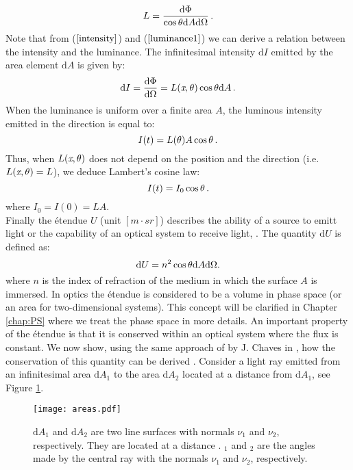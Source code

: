 \begin{equation}\label{luminance1}
  L=\frac{\textrm{d}\Phi}{\cos\mbox{$\theta$}\textrm{d}A\textrm{d}\Omega}\,.
\end{equation}
\noindent Note that from ($\ref{intensity}$) and ($\ref{luminance1}$) we can derive a relation between the intensity and the luminance. The infinitesimal intensity $\textrm{d}I $ emitted by the area element $\textrm{d}A$ is given by:
\begin{equation}
\textrm{d}I = \frac{\textrm{d}\Phi}{\textrm{d}\Omega}= L(\textit{x},\mbox{$\theta$})\cos\mbox{$\theta$}\textrm{d}A \,.
\end{equation}
When the luminance is uniform over a finite area $A$, the luminous intensity emitted in the direction \myangle  is equal to:
\begin{equation}
I(t) = L(\mbox{$\theta$}) A \cos\mbox{$\theta$}\,.
\end{equation}
Thus, when $L(\textit{x},\mbox{$\theta$})$ does not depend on the position and the direction (i.e. $L(\textit{x},\mbox{$\theta$})=L$), we deduce Lambert's cosine law:
\begin{equation}
I(t) = I_0\cos\mbox{$\theta$}\,.
\end{equation}
where $I_0 = I(0) = LA$. \\
Finally the \'{e}tendue $U$ (unit $[m \cdot sr]$) describes the ability of a source to emitt light or the capability of an optical system to receive light, \cite{zhu2011etendue}.
The quantity $ \textrm{d}U $ is defined as:
\begin{equation}\label{etendue}
\textrm{d}U = n^2 \cos\mbox{$\theta$}\textrm{d}A\textrm{d}\Omega.
\end{equation}
where $n$ is the index of refraction of the medium in which the surface $A$ is immersed. In optics the \'{e}tendue is considered to be a volume in phase space  (or an area for two-dimensional systems). This concept will be clarified in Chapter \ref{chap:PS} where we treat the phase space in more details.
An important property of the \'{e}tendue is that it is conserved within an optical system where the flux is constant. We now show, using the same approach of by J. Chaves in \cite{chaves2015introduction}, how the conservation of this quantity can be derived .
Consider a light ray emitted from an infinitesimal area $\textrm{d}A_1$ to the area $\textrm{d}A_2$ located at a distance  from $\textrm{d}A_1$,  see Figure \ref{fig:etendue_conservation}.
\begin{figure}[h]
 \label{fig:etendue_conservation}
     \begin{center}
     \texttt{[image: areas.pdf]}
     \end{center}
     \caption{\footnotesize{$\textrm{d}A_1$ and $\textrm{d}A_2$ are two line surfaces with normals $\nu_1$ and $\nu_2$, respectively. They are located at a distance .
\myangle$_1$ and \myangle$_2$ are the angles made by the central ray with the normals $\nu_1$ and $\nu_2$, respectively.}}
\label{fig:etendue_conservation}
 \end{figure}
